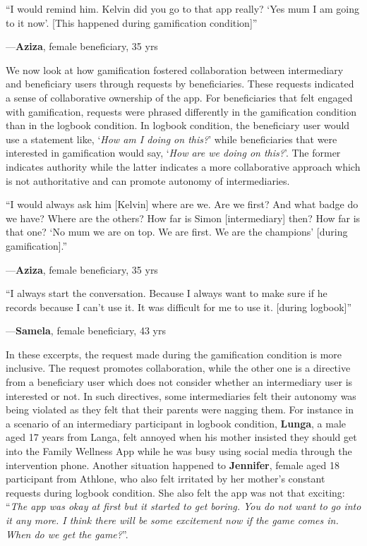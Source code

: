 \documentclass{sig-alternate}
\newenvironment{myquote}
               {\list{}{\rightmargin   \leftmargin
                        \parsep        0in }%
                \item\relax}
               {\endlist}
\newcommand{\userquote}[2]{\begin{samepage}\begin{myquote} 
     \em{\small{#2\begin{flushright}---#1\end{flushright}}}
   \end{myquote}\end{samepage}}
\begin{document}
\userquote{\textbf{Aziza}, female beneficiary, 35 yrs} {``I would remind him. Kelvin did you go to that app really? `Yes mum I am going to it now'. [This happened during gamification condition]''} 

We now look at how gamification fostered collaboration between intermediary and beneficiary users through requests by beneficiaries. These requests indicated a sense of collaborative ownership of the app. For beneficiaries that felt engaged with gamification, requests were phrased differently in the gamification condition than in the logbook condition. In logbook condition, the beneficiary user would use a statement like, `\emph{How am I doing on this?}' while beneficiaries that were interested in gamification would say, `\emph{How are we doing on this?}'. The former indicates authority while the latter indicates a more collaborative approach which is not authoritative and can promote autonomy of intermediaries.

\userquote{\textbf{Aziza}, female beneficiary, 35 yrs}{``I would always ask him [Kelvin] where are we. Are we first? And what badge do we have? Where are the others? How far is Simon [intermediary] then? How far is that one? `No mum we are on top. We are first. We are the champions' [during gamification].''} 

\userquote{\textbf{Samela}, female beneficiary, 43 yrs} {``I always start the conversation. Because I always want to make sure if he records because I can't use it. It was difficult for me to use it. [during logbook]''}

In these excerpts, the request made during the gamification condition is more inclusive. The request promotes collaboration, while the other one is a directive from a beneficiary user which does not consider whether an intermediary user is interested or not. In such directives, some intermediaries felt their autonomy was being violated as they felt that their parents were nagging them. For instance in a scenario of an intermediary participant in logbook condition, \textbf{Lunga}, a male aged 17 years from Langa, felt annoyed when his mother insisted they should get into the Family Wellness App while he was busy using social media through the intervention phone. Another situation happened to \textbf{Jennifer}, female aged 18 participant from Athlone, who also felt irritated by her mother's constant requests during logbook condition. She also felt the app was not that exciting: ``\emph{The app was okay at first but it started to get boring. You do not want to go into it any more. I think there will be some excitement now if the game comes in. When do we get the game?}''. 
\end{document}

